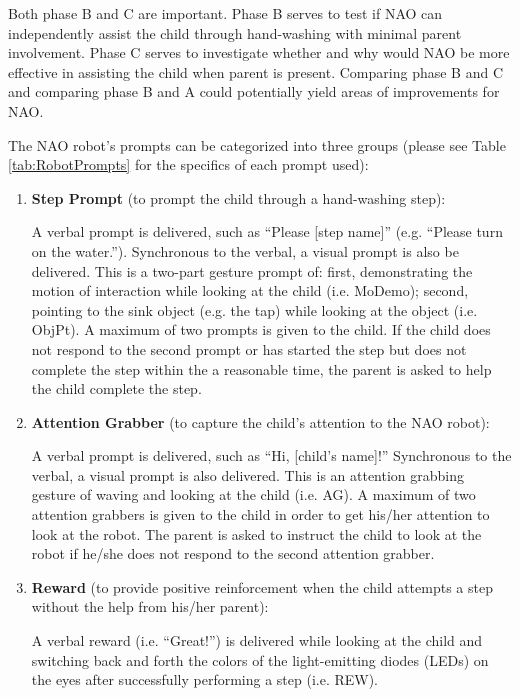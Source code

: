 Both phase B and C are important.  Phase B serves to test if NAO can independently assist the child through hand-washing with minimal parent involvement.  Phase C serves to investigate whether and why would NAO be more effective in assisting the child when parent is present.  Comparing phase B and C and comparing phase B and A could potentially yield areas of improvements for NAO.

The NAO robot's prompts can be categorized into three groups (please see Table \ref{tab:RobotPrompts} for the specifics of each prompt used):
\begin{enumerate}
	\item \textbf{Step Prompt} (to prompt the child through a hand-washing step):
	
	A verbal prompt is delivered, such as “Please [step name]” (e.g. “Please turn on the water.”).  Synchronous to the verbal, a visual prompt is also be delivered. This is a two-part gesture prompt of: first, demonstrating the motion of interaction while looking at the child (i.e. MoDemo); second, pointing to the sink object (e.g. the tap) while looking at the object (i.e. ObjPt). A maximum of two prompts is given to the child. If the child does not respond to the second prompt or has started the step but does not complete the step within the a reasonable time, the parent is asked to help the child complete the step. 
	
	\item \textbf{Attention Grabber} (to capture the child's attention to the NAO robot): 
	
	A verbal prompt is delivered, such as “Hi, [child's name]!”  Synchronous to the verbal, a visual prompt is also delivered. This is an attention grabbing gesture of waving and looking at the child (i.e. AG). A maximum of two attention grabbers is given to the child in order to get his/her attention to look at the robot.  The parent is asked to instruct the child to look at the robot if he/she does not respond to the second attention grabber. 
	
	\item \textbf{Reward} (to provide positive reinforcement when the child attempts a step without the help from his/her parent): 
	
	A verbal reward (i.e. “Great!”) is delivered while looking at the child and switching back and forth the colors of the light-emitting diodes (LEDs) on the eyes after successfully performing a step (i.e. REW).
\end{enumerate}
